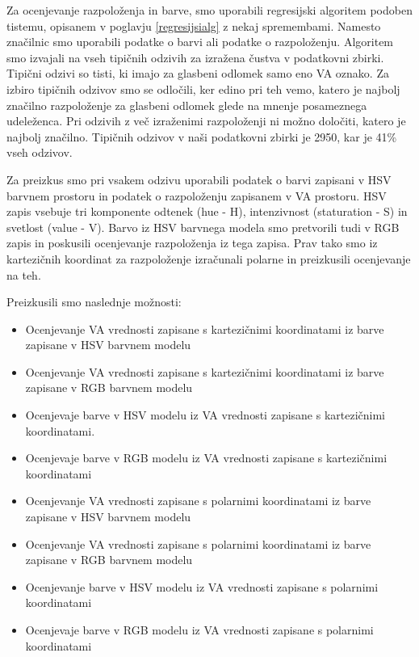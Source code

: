 \documentclass[a4paper, 12pt]{book}
\begin{document}
{Za ocenjevanje razpoloženja in barve, smo uporabili regresijski algoritem podoben tistemu, opisanem v poglavju \ref{regresijsialg} z nekaj spremembami. Namesto značilnic smo uporabili podatke o barvi ali podatke o razpoloženju. Algoritem smo izvajali na vseh tipičnih odzivih za izražena čustva v podatkovni zbirki. Tipični odzivi so tisti, ki imajo za glasbeni odlomek samo eno VA oznako. Za izbiro tipičnih odzivov smo se odločili, ker edino pri teh vemo, katero je najbolj značilno razpoloženje za glasbeni odlomek glede na mnenje posameznega udeleženca. Pri odzivih z več izraženimi razpoloženji ni možno določiti, katero je najbolj značilno. Tipičnih odzivov v naši podatkovni zbirki je 2950, kar je 41\% vseh odzivov. 

Za preizkus smo pri vsakem odzivu uporabili podatek o barvi zapisani v HSV barvnem prostoru in podatek o razpoloženju zapisanem v VA prostoru. HSV zapis \cite{Sural2002} vsebuje tri komponente odtenek (hue - H), intenzivnost (staturation - S) in svetlost (value - V). Barvo iz HSV barvnega modela smo pretvorili tudi v RGB zapis \cite{susstrunk1999standard} in poskusili ocenjevanje razpoloženja iz tega zapisa. Prav tako smo iz kartezičnih koordinat za razpoloženje izračunali polarne \cite{julier1997consistent} in preizkusili ocenjevanje na teh.

Preizkusili smo naslednje možnosti:
\begin{itemize}
\item Ocenjevanje VA vrednosti zapisane s kartezičnimi koordinatami iz barve zapisane v HSV barvnem modelu
\item Ocenjevanje VA vrednosti zapisane s kartezičnimi koordinatami iz barve zapisane v RGB barvnem modelu
\item Ocenjevaje barve v HSV modelu iz VA vrednosti zapisane s kartezičnimi koordinatami.
\item Ocenjevaje barve v RGB modelu iz VA vrednosti zapisane s kartezičnimi koordinatami
\item Ocenjevanje VA vrednosti zapisane s polarnimi koordinatami iz barve zapisane v HSV barvnem modelu
\item Ocenjevanje VA vrednosti zapisane s polarnimi koordinatami iz barve zapisane v RGB barvnem modelu
\item Ocenjevanje barve v HSV modelu iz VA vrednosti zapisane s polarnimi koordinatami
\item Ocenjevaje barve v RGB modelu iz VA vrednosti zapisane s polarnimi koordinatami

\end{itemize}

}
\end{document}
